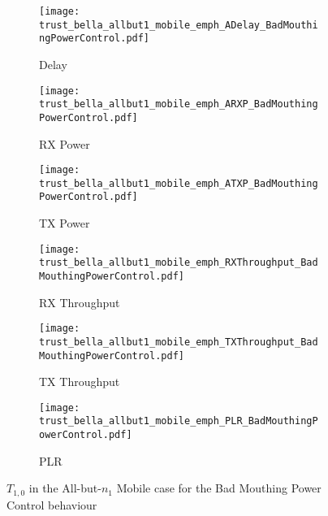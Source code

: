 \documentclass[runningheads,a4paper]{llncs}
\begin{document}
\begin{figure}
\begin{subfigure}{0.32\textwidth}
  \centering
  \texttt{[image: trust\_bella\_allbut1\_mobile\_emph\_ADelay\_BadMouthingPowerControl.pdf]}
  \caption{Delay}
  \label{fig:allbut1_mobile_badmouthing_delay}
\end{subfigure}
\begin{subfigure}{0.32\textwidth}
\centering
  \texttt{[image: trust\_bella\_allbut1\_mobile\_emph\_ARXP\_BadMouthingPowerControl.pdf]}
  \caption{RX Power}
  \label{fig:allbut1_mobile_badmouthing_rxp}
\end{subfigure}
\begin{subfigure}{0.32\textwidth}
\centering
  \texttt{[image: trust\_bella\_allbut1\_mobile\_emph\_ATXP\_BadMouthingPowerControl.pdf]}
  \caption{TX Power}
  \label{fig:allbut1_mobile_badmouthing_txp}
\end{subfigure}
\begin{subfigure}{0.32\textwidth}
\centering
  \texttt{[image: trust\_bella\_allbut1\_mobile\_emph\_RXThroughput\_BadMouthingPowerControl.pdf]}
  \caption{RX Throughput}
  \label{fig:allbut1_mobile_badmouthing_rxthroughput}
\end{subfigure}
\begin{subfigure}{0.32\textwidth}
\centering
  \texttt{[image: trust\_bella\_allbut1\_mobile\_emph\_TXThroughput\_BadMouthingPowerControl.pdf]}
  \caption{TX Throughput}
  \label{fig:allbut1_mobile_badmouthing_txthroughput}
\end{subfigure}
\begin{subfigure}{0.32\textwidth}
\centering
  \texttt{[image: trust\_bella\_allbut1\_mobile\_emph\_PLR\_BadMouthingPowerControl.pdf]}
  \caption{PLR}
  \label{fig:allbut1_mobile_badmouthing_plr}
\end{subfigure}
\caption{$T_{1,0}$ in the All-but-$n_1$ Mobile case for the Bad Mouthing Power Control behaviour}
\label{fig:allbut1_mobile_badmouthing}
\end{figure}
\end{document}
